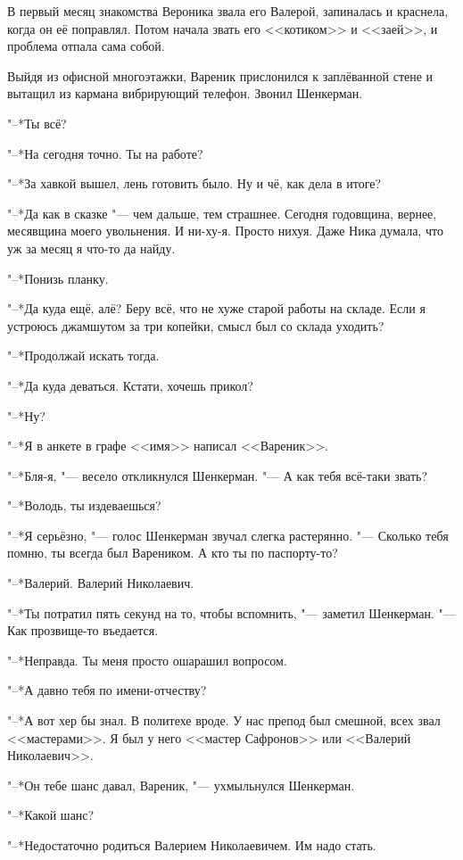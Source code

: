 В первый месяц знакомства Вероника звала его Валерой, запиналась и краснела, когда он её поправлял.
Потом начала звать его <<котиком>> и <<заей>>, и проблема отпала сама собой.

Выйдя из офисной многоэтажки, Вареник прислонился к заплёванной стене и вытащил из кармана вибрирующий телефон.
Звонил Шенкерман.

"--*Ты всё?

"--*На сегодня точно.
Ты на работе?

"--*За хавкой вышел, лень готовить было.
Ну и чё, как дела в итоге?

"--*Да как в сказке "--- чем дальше, тем страшнее.
Сегодня годовщина, вернее, месявщина моего увольнения.
И ни-ху-я.
Просто нихуя.
Даже Ника думала, что уж за месяц я что-то да найду.

"--*Понизь планку.

"--*Да куда ещё, алё?
Беру всё, что не хуже старой работы на складе.
Если я устроюсь джамшутом за три копейки, смысл был со склада уходить?

"--*Продолжай искать тогда.

"--*Да куда деваться.
Кстати, хочешь прикол?

"--*Ну?

"--*Я в анкете в графе <<имя>> написал <<Вареник>>.

"--*Бля-я, "--- весело откликнулся Шенкерман.
"--- А как тебя всё-таки звать?

"--*Володь, ты издеваешься?

"--*Я серьёзно, "--- голос Шенкерман звучал слегка растерянно.
"--- Сколько тебя помню, ты всегда был Вареником.
А кто ты по паспорту-то?

"--*Валерий.
Валерий Николаевич.

"--*Ты потратил пять секунд на то, чтобы вспомнить, "--- заметил Шенкерман.
"--- Как прозвище-то въедается.

"--*Неправда.
Ты меня просто ошарашил вопросом.

"--*А давно тебя по имени-отчеству?

"--*А вот хер бы знал.
В политехе вроде.
У нас препод был смешной, всех звал <<мастерами>>.
Я был у него <<мастер Сафронов>> или <<Валерий Николаевич>>.

"--*Он тебе шанс давал, Вареник, "--- ухмыльнулся Шенкерман.

"--*Какой шанс?

"--*Недостаточно родиться Валерием Николаевичем.
Им надо стать.

